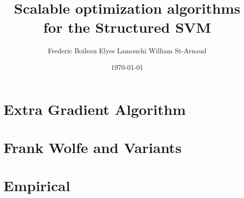 
\title{Scalable optimization algorithms for the Structured SVM}
\date{\today}
\author{Frederic Boileau Elyes Lamouchi William St-Arnaud}

\maketitle

\section{Extra Gradient Algorithm}

\section{Frank Wolfe and Variants}

\section{Empirical}


